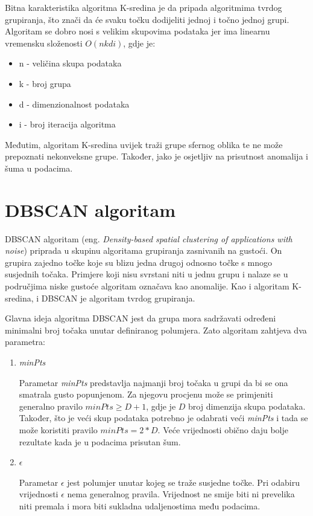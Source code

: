 \documentclass[utf8, diplomski, numeric]{fer}
\begin{document}
Bitna karakteristika algoritma K-sredina je da pripada algoritmima tvrdog grupiranja, što znači da će svaku točku dodijeliti jednoj i točno jednoj grupi. Algoritam se dobro nosi s velikim skupovima podataka jer ima linearnu vremensku složenosti $O(nkdi)$, gdje je:
\begin{itemize}
\item n - veličina skupa podataka
\item k - broj grupa
\item d - dimenzionalnost podataka
\item i - broj iteracija algoritma
\end{itemize}

Međutim, algoritam K-sredina uvijek traži grupe sfernog oblika te ne može prepoznati nekonveksne grupe. Također, jako je osjetljiv na prisutnost anomalija i šuma u podacima.

\section{DBSCAN algoritam}
DBSCAN algoritam (eng. \textit{Density-based spatial clustering of applications with noise}) priprada u skupinu algoritama grupiranja zasnivanih na gustoći. On grupira zajedno točke koje su blizu jedna drugoj odnosno točke s mnogo susjednih točaka. Primjere koji nisu svrstani niti u jednu grupu i nalaze se u područjima niske gustoće algoritam označava kao anomalije. Kao i algoritam K-sredina, i DBSCAN je algoritam tvrdog grupiranja.

Glavna ideja algoritma DBSCAN jest da grupa mora sadržavati određeni minimalni broj točaka unutar definiranog polumjera. Zato algoritam zahtjeva dva parametra: 
\begin{enumerate}
\item \textit{minPts} 

Parametar \textit{minPts} predstavlja najmanji broj točaka u grupi da bi se ona smatrala gusto popunjenom. Za njegovu procjenu može se primjeniti generalno pravilo $minPts \geq D + 1$, gdje je $D$ broj dimenzija skupa podataka. Također, što je veći skup podataka potrebno je odabrati veći \textit{minPts} i tada se može koristiti pravilo $minPts = 2*D$. Veće vrijednosti obično daju bolje rezultate kada je u podacima prisutan šum.
\item $\epsilon$

Parametar $\epsilon$ jest polumjer unutar kojeg se traže susjedne točke. Pri odabiru vrijednosti $\epsilon$ nema generalnog pravila. Vrijednost ne smije biti ni prevelika niti premala i mora biti sukladna udaljenostima među podacima. 
\end{enumerate}
\end{document}
